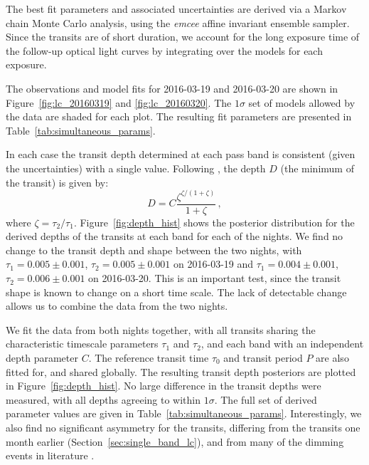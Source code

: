 \documentclass[iop,useAMES,usenatbig]{emulateapj}
\begin{document}
The best fit parameters and associated uncertainties are derived via a Markov chain Monte Carlo analysis, using the \emph{emcee} \citep{2013PASP..125..306F} affine invariant ensemble sampler. Since the transits are of short duration, we account for the long exposure time of the follow-up optical light curves by integrating over the models for each exposure.

The observations and model fits for 2016-03-19 and 2016-03-20 are shown in Figure~\ref{fig:lc_20160319} and \ref{fig:lc_20160320}. The $1\sigma$ set of models allowed by the data are shaded for each plot. The resulting fit parameters are presented in Table~\ref{tab:simultaneous_params}. 

In each case the transit depth determined at each pass band is consistent (given the uncertainties) with a single value. Following \citet{2015arXiv151006434C}, the depth $D$ (the minimum of the transit) is given by: 
\begin{equation}
D = C \frac{\zeta^{\zeta/(1+\zeta)} }{1+\zeta}\,,
\end{equation}
where $\zeta = \tau_2/\tau_1$. Figure~\ref{fig:depth_hist} shows the posterior distribution for the derived depths of the transits at each band for each of the nights. We find no change to the transit depth and shape between the two nights, with $\tau_1 = 0.005\pm0.001$, $\tau_2 = 0.005\pm0.001$ on 2016-03-19 and $\tau_1 = 0.004\pm0.001$, $\tau_2 = 0.006\pm0.001$ on 2016-03-20. This is an important test, since the transit shape is known to change on a short time scale. The lack of detectable change allows us to combine the data from the two nights. 

We fit the data from both nights together, with all transits sharing the characteristic timescale parameters $\tau_1$ and $\tau_2$, and each band with an independent depth parameter $C$. The reference transit time $\tau_0$ and transit period $P$ are also fitted for, and shared globally. The resulting transit depth posteriors are plotted in Figure~\ref{fig:depth_hist}. No large difference in the transit depths were measured, with all depths agreeing to within $1\sigma$. The full set of derived parameter values are given in Table~\ref{tab:simultaneous_params}. Interestingly, we also find no significant asymmetry for the transits, differing from the transits one month earlier (Section~\ref{sec:single_band_lc}), and from many of the dimming events in literature \citep[e.g. FLWO transits from ][]{2015Natur.526..546V}. 
\end{document}
